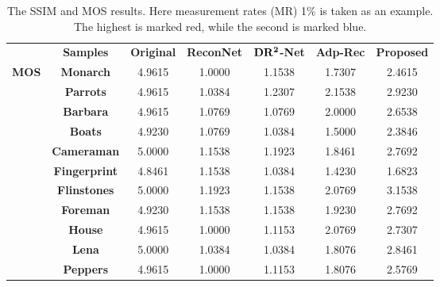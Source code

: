 \documentclass[review]{elsarticle}
\begin{document}
\begin{table}[h!]
	\centering
	\footnotesize
	\caption{The SSIM and MOS results. Here measurement rates (MR) 1\% is taken as an example. The highest is marked red, while the second is marked blue.
}
	\label{tab:SSIM}
	\renewcommand\arraystretch{0.8}
	\begin{tabular}{|c|cccccc|}
		\hline
		\rowcolor[HTML]{87B0FF}
		& \textbf{Samples} & \textbf{Original} & \textbf{ReconNet} & \textbf{$\bf{DR^2}$-Net} & \textbf{Adp-Rec}  & \textbf{Proposed}   \\
\multirow{12}{0.8cm}{\textbf{MOS}} & \textbf{Monarch}          & 4.9615           & 1.0000                       & {1.1538} & {\color[HTML]{0000FF} 1.7307} & {\color[HTML]{CC0000} 2.4615} \\
		& \textbf{Parrots}        & 4.9615           & 1.0384                       & {1.2307} & {\color[HTML]{0000FF} 2.1538} & {\color[HTML]{CC0000} 2.9230} \\
		& \textbf{Barbara}        & 4.9615           & 1.0769                       & {1.0769} & {\color[HTML]{0000FF} 2.0000} & {\color[HTML]{CC0000} 2.6538} \\
		& \textbf{Boats}          & 4.9230           & 1.0769                       & {1.0384} & {\color[HTML]{0000FF} 1.5000} & {\color[HTML]{CC0000} 2.3846}  \\
		& \textbf{Cameraman}      & 5.0000           & 1.1538                       & {1.1923} & {\color[HTML]{0000FF} 1.8461} & {\color[HTML]{CC0000} 2.7692} \\
		& \textbf{Fingerprint}    & 4.8461           & 1.1538                       & {1.0384} & {\color[HTML]{0000FF} 1.4230} & {\color[HTML]{CC0000} 1.6823} \\
		& \textbf{Flinstones}     & 5.0000           & 1.1923                       & {1.1538} & {\color[HTML]{0000FF} 2.0769} & {\color[HTML]{CC0000} 3.1538} \\
		& \textbf{Foreman}        & 4.9230           & 1.1538                       & {1.1538} & {\color[HTML]{0000FF} 1.9230} & {\color[HTML]{CC0000} 2.7692} \\
		& \textbf{House}          & 4.9615           & 1.0000                       & {1.1153} & {\color[HTML]{0000FF} 2.0769} & {\color[HTML]{CC0000} 2.7307} \\
		& \textbf{Lena}           & 5.0000           & 1.0384                       & {1.0384} & {\color[HTML]{0000FF} 1.8076} & {\color[HTML]{CC0000} 2.8461} \\
		& \textbf{Peppers}        & 4.9615           & 1.0000                       & {1.1153} & {\color[HTML]{0000FF} 1.8076} & {\color[HTML]{CC0000} 2.5769} \\

\end{tabular}
\end{table}
\end{document}
